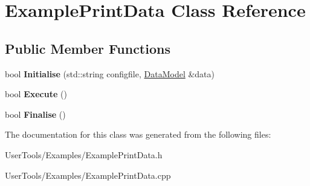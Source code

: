 \hypertarget{classExamplePrintData}{
\section{ExamplePrintData Class Reference}
\label{classExamplePrintData}
}
\subsection*{Public Member Functions}
\begin{DoxyCompactItemize}
\item 
\hypertarget{classExamplePrintData_a307dfd08e3e97a41630506b1796dc89f}{
bool {\bfseries Initialise} (std::string configfile, \hyperlink{classDataModel}{DataModel} \&data)}
\label{classExamplePrintData_a307dfd08e3e97a41630506b1796dc89f}

\item 
\hypertarget{classExamplePrintData_aa976e0555bc68a07f9525f556bb51352}{
bool {\bfseries Execute} ()}
\label{classExamplePrintData_aa976e0555bc68a07f9525f556bb51352}

\item 
\hypertarget{classExamplePrintData_a6b47fdbb41a982a082857c3fd94ac7a9}{
bool {\bfseries Finalise} ()}
\label{classExamplePrintData_a6b47fdbb41a982a082857c3fd94ac7a9}

\end{DoxyCompactItemize}


The documentation for this class was generated from the following files:\begin{DoxyCompactItemize}
\item 
UserTools/Examples/ExamplePrintData.h\item 
UserTools/Examples/ExamplePrintData.cpp\end{DoxyCompactItemize}
